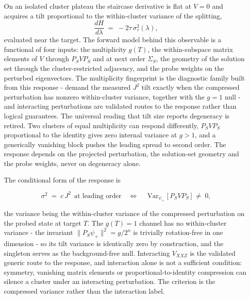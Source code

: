 On an isolated cluster plateau the staircase derivative is flat at $V = 0$ and acquires a tilt proportional to the within-cluster variance of the splitting,
\[
\frac{dH}{d\lambda} \;=\; -2\tau\, \sigma_\tau^2(\lambda),
\]
evaluated near the target. The forward model behind this observable is a functional of four inputs: the multiplicity $g(T)$, the within-subspace matrix elements of $V$ through $P_S V P_S$ and at next order $\Sigma_S$, the geometry of the solution set through the cluster-restricted adjacency, and the probe weights on the perturbed eigenvectors. The multiplicity fingerprint is the diagnostic family built from this response - demand the measured $J^2$ tilt exactly when the compressed perturbation has nonzero within-cluster variance, together with the $g = 1$ null - and interacting perturbations are validated routes to the response rather than logical guarantees. The universal reading that tilt size reports degeneracy is retired. Two clusters of equal multiplicity can respond differently, $P_S V P_S$ proportional to the identity gives zero internal variance at $g > 1$, and a generically vanishing block pushes the leading spread to second order. The response depends on the projected perturbation, the solution-set geometry and the probe weights, never on degeneracy alone.

The conditional form of the response is
\begin{widetext}
\[
\sigma^2 \;=\; c\, J^2 \ \ \text{at leading order} \quad\Longleftrightarrow\quad \operatorname{Var}_{\psi_+}\!\bigl[\, P_S V P_S \,\bigr] \;\neq\; 0,
\]
\end{widetext}
the variance being the within-cluster variance of the compressed perturbation on the probed state at target $T$. The $g(T) = 1$ channel has no within-cluster variance - the invariant $\|P_S \psi_+\|^2 = g/2^n$ is trivially rotation-free in one dimension - so its tilt variance is identically zero by construction, and the singleton serves as the background-free null. Interacting $V_{XXZ}$ is the validated generic route to the response, and interaction alone is not a sufficient condition: symmetry, vanishing matrix elements or proportional-to-identity compression can silence a cluster under an interacting perturbation. The criterion is the compressed variance rather than the interaction label.

